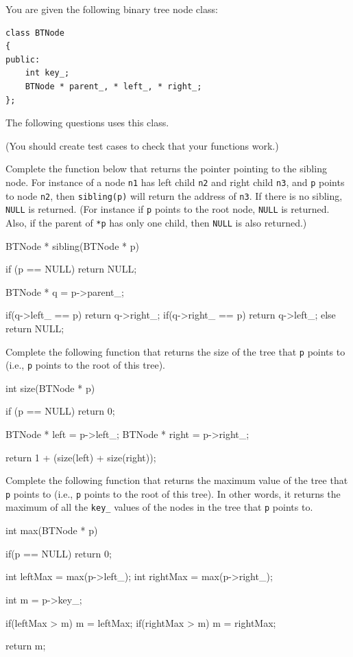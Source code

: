 

You are given the following binary tree node class:
\begin{Verbatim}[frame=single,fontsize=\footnotesize]
class BTNode
{
public:
    int key_;
    BTNode * parent_, * left_, * right_;
};
\end{Verbatim}
The following questions uses this class.

(You should create test cases to check that your functions work.)

\nextq
Complete the function below that returns the pointer
pointing to the sibling node.
For instance of a node \verb!n1! has left child \verb!n2! and
right child \verb!n3!,
and \verb!p! points to node \verb!n2!, then \verb!sibling(p)! will return
the address of \verb!n3!.
If there is no sibling, \verb!NULL! is returned.
(For instance if \verb!p! points to the root node, \verb!NULL!
is returned.
Also, if the parent of \verb!*p! has only one child, then \verb!NULL! is
also returned.)
\\
\ANSWER
\begin{answercode}
BTNode * sibling(BTNode * p)
{
  if (p == NULL)
      return NULL;
  
  BTNode * q = p->parent_;

  if(q->left_ == p)
      return q->right_;
  if(q->right_ == p)
      return q->left_;
  else
      return NULL;
}
\end{answercode}

\nextq
Complete the following function that returns the size of the
tree that \verb!p! points to (i.e., \verb!p! points to the root of this tree).
\\
\ANSWER
\begin{answercode}
int size(BTNode * p)
{
  if (p == NULL)
      return 0;

  BTNode * left = p->left_;
  BTNode * right = p->right_;

  return 1 + (size(left) + size(right));
}
\end{answercode}

\nextq
Complete the following function that returns the maximum value of the
tree that \verb!p! points to (i.e., \verb!p! points to the root of this tree).
In other words, it returns the maximum of all the \verb!key_! values
of the nodes in the tree that \verb!p! points to.
\\
\ANSWER
\begin{answercode}
int max(BTNode * p)
{
  if(p == NULL)
      return 0;

  int leftMax = max(p->left_);
  int rightMax = max(p->right_);

  int m = p->key_;

  if(leftMax > m) m = leftMax;
  if(rightMax > m) m = rightMax;

  return m;
}
\end{answercode}


